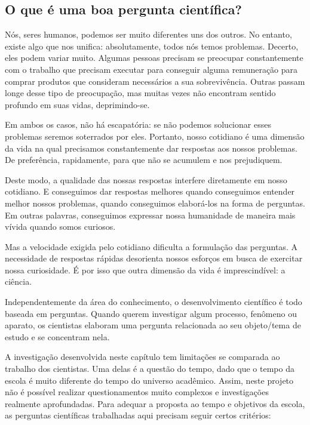 \label{etapa2}
\label{pergunta-cientifica}
\vspace{-.5\baselineskip}
\subsection{O que é uma boa pergunta científica?}

Nós, seres humanos, podemos ser muito diferentes uns dos outros. No entanto, existe algo que nos unifica: absolutamente, todos nós temos problemas. Decerto, eles podem variar muito. Algumas pessoas precisam se preocupar constantemente com o trabalho que precisam executar para conseguir alguma remuneração para comprar produtos que consideram necessários a sua sobrevivência. Outras passam longe desse tipo de preocupação, mas muitas vezes não encontram sentido profundo em suas vidas, deprimindo-se.

Em ambos os casos, não há escapatória: se não podemos solucionar esses problemas seremos soterrados por eles. Portanto, nosso cotidiano é uma dimensão da vida na qual precisamos constantemente dar respostas aos nossos problemas. De preferência, rapidamente, para que não se acumulem e nos prejudiquem.

Deste modo, a qualidade das nossas respostas interfere diretamente em nosso cotidiano. E conseguimos dar respostas melhores quando conseguimos entender melhor nossos problemas, quando conseguimos elaborá-los na forma de perguntas. Em outras palavras, conseguimos expressar nossa humanidade de maneira mais vívida quando somos curiosos.  

Mas a velocidade exigida pelo cotidiano dificulta a formulação das perguntas. A necessidade de respostas rápidas desorienta nossos esforços em busca de exercitar nossa curiosidade. É por isso que outra dimensão da vida é imprescindível: a ciência.

Independentemente da área do conhecimento, o desenvolvimento científico é todo baseada em perguntas. Quando querem investigar algum processo, fenômeno ou aparato, os cientistas elaboram uma pergunta relacionada ao seu objeto/tema de estudo e se concentram nela. 

A investigação desenvolvida neste capítulo tem limitações se comparada ao trabalho dos cientistas. Uma delas é a questão do tempo, dado que o tempo da escola é muito diferente do tempo do universo acadêmico. Assim, neste projeto não é possível realizar questionamentos muito complexos e investigações realmente aprofundadas. Para adequar a proposta ao tempo e objetivos da escola, as perguntas científicas trabalhadas aqui precisam seguir certos critérios:

